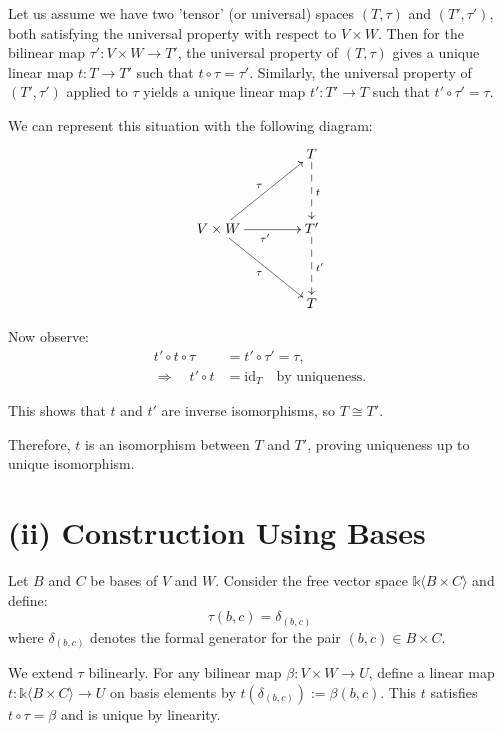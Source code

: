 \documentclass[10pt]{tufte-handout}
\begin{document}
Let us assume we have two 'tensor' (or universal) spaces $(T, \tau)$ and $(T', \tau')$, both satisfying the universal property with respect to $V \times W$. Then for the bilinear map $\tau' : V \times W \to T'$, the universal property of $(T, \tau)$ gives a unique linear map $t : T \to T'$ such that $t \circ \tau = \tau'$. Similarly, the universal property of $(T', \tau')$ applied to $\tau$ yields a unique linear map $t' : T' \to T$ such that $t' \circ \tau' = \tau$.

\begin{samepage}
We can represent this situation with the following diagram:
\[
\xymatrix@C=4em@R=4em{
& T \ar@{-->}[d]^{t} \\
V \times W \ar[ur]^{\tau} \ar[r]_{\tau'} \ar[dr]_{\tau} & T' \ar@{-->}[d]^{t'} \\
& T
}
\]
\end{samepage}


Now observe:
\begin{align*}
    t' \circ t \circ \tau &= t' \circ \tau' = \tau, \\
    \Rightarrow\quad t' \circ t &= \mathrm{id}_T \quad \text{by uniqueness.} 
\end{align*}

This shows that $t$ and $t'$ are inverse isomorphisms, so $T \cong T'$.


Therefore, $t$ is an isomorphism between $T$ and $T'$, proving uniqueness up to unique isomorphism.

\section{(ii) Construction Using Bases}
Let $B$ and $C$ be bases of $V$ and $W$. Consider the free vector space $\mathds{k}\langle B \times C \rangle$ and define:
\[ \tau(b, c) = \delta_{(b, c)} \]
where $\delta_{(b,c)}$ denotes the formal generator for the pair $(b, c) \in B \times C$.


We extend $\tau$ bilinearly. For any bilinear map $\beta : V \times W \to U$, define a linear map $t : \mathds{k}\langle B \times C \rangle \to U$ on basis elements by $t(\delta_{(b, c)}) := \beta(b, c)$. This $t$ satisfies $t \circ \tau = \beta$ and is unique by linearity.
\end{document}
